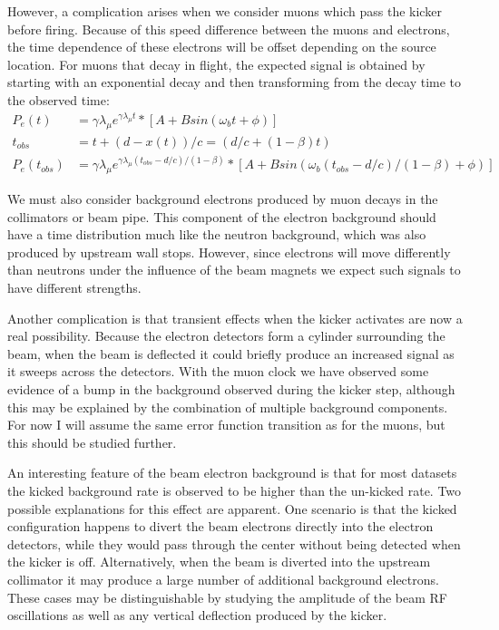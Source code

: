 However, a complication arises when we consider muons which pass the kicker before firing.
Because of this speed difference between the muons and electrons, the time dependence of these electrons will be offset depending on the source location.
For muons that decay in flight, the expected signal is obtained by starting with an exponential decay and then transforming from the decay time to the observed time:
\begin{align}
P_e(t) & = \gamma \lambda_{\mu} e^{\gamma \lambda_{\mu} t} * [A + B sin(\omega_b t + \phi)]\\
t_{obs} & = t + (d-x(t))/c = (d/c+(1-\beta)t) \\
P_e(t_{obs}) & = \gamma \lambda_{\mu} e^{\gamma \lambda_{\mu} (t_{obs}-d/c)/(1-\beta)} * [A + B sin(\omega_b (t_{obs}-d/c)/(1-\beta) + \phi)]
\end{align}

We must also consider background electrons produced by muon decays in the collimators or beam pipe.  
This component of the electron background should have a time distribution much like the neutron background, which was also produced by upstream wall stops.
However, since electrons will move differently than neutrons under the influence of the beam magnets we expect such signals to have different strengths.

Another complication is that transient effects when the kicker activates are now a real possibility.
Because the electron detectors form a cylinder surrounding the beam, when the beam is deflected it could briefly produce an increased signal as it sweeps across the detectors.
With the muon clock we have observed some evidence of a bump in the background observed during the kicker step, although this may be explained by the combination of multiple background components.
For now I will assume the same error function transition as for the muons, but this should be studied further.

An interesting feature of the beam electron background is that for most datasets the kicked background rate is observed to be higher than the un-kicked rate.
Two possible explanations for this effect are apparent.
One scenario is that the kicked configuration happens to divert the beam electrons directly into the electron detectors, while they would pass through the center without being detected when the kicker is off.
Alternatively, when the beam is diverted into the upstream collimator it may produce a large number of additional background electrons.
These cases may be distinguishable by studying the amplitude of the beam RF oscillations as well as any vertical deflection produced by the kicker.

